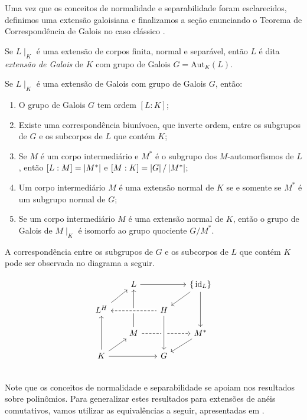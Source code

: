 Uma vez que os conceitos de normalidade e separabilidade foram esclarecidos, definimos uma extensão galoisiana e finalizamos a seção enunciando o Teorema de Correspondência de Galois no caso clássico \cite[Theorem 17.23, p.202]{stewart}.

\begin{defn}
Se $L\mid_K$ é uma extensão de corpos finita, normal e separável, então $L$ é dita \emph{extensão de Galois} de $K$ com grupo de Galois $G = \textrm{Aut}_K(L)$.
\end{defn}


\begin{teo}
Se $L\mid_K$ é uma extensão de Galois com grupo de Galois $G$, então:
\begin{enumerate}
    \item O grupo de Galois $G$ tem ordem $[L:K]$;
    \item Existe uma correspondência biunívoca, que inverte ordem, entre os subgrupos de $G$ e os subcorpos de $L$ que contém $K$;
    \item Se $M$ é um corpo intermediário e $M^*$ é o subgrupo dos $M$-automorfismos de $L$, então $[L:M] = \left| M^* \right|$ e $[M:K] = \left| G \right|/\left| M^* \right|$;
    \item Um corpo intermediário $M$ é uma extensão normal de $K$ se e somente se $M^*$ é um subgrupo normal de $G$;
    \item Se um corpo intermediário $M$ é uma extensão normal de $K$, então o grupo de Galois de $M\mid_K$ é isomorfo ao grupo quociente $G/M^*$.
\end{enumerate}
\end{teo}

A correspondência entre os subgrupos de $G$ e os subcorpos de $L$ que contém $K$ pode ser observada no diagrama a seguir.

\[\begin{tikzcd}[row sep=scriptsize, column sep=scriptsize]
& L \arrow[leftarrow]{dl}\arrow{rr}\arrow[leftarrow]{dd} & & \{\id{L}\} \arrow{dl}\arrow{dd} \\
L^H \arrow[crossing over, leftarrow, dashed]{rr}\arrow[leftarrow]{dd} & & H \\
& M \arrow[leftarrow]{dl}\arrow[dashed]{rr} & & M^* \arrow{dl} \\
K \arrow{rr} & & G\arrow[crossing over, leftarrow]{uu} \\
\end{tikzcd}\]

Note que os conceitos de normalidade e separabilidade se apoiam nos resultados sobre polinômios. Para generalizar estes resultados para extensões de anéis comutativos, vamos utilizar as equivalências a seguir, apresentadas em \cite{paques}.

